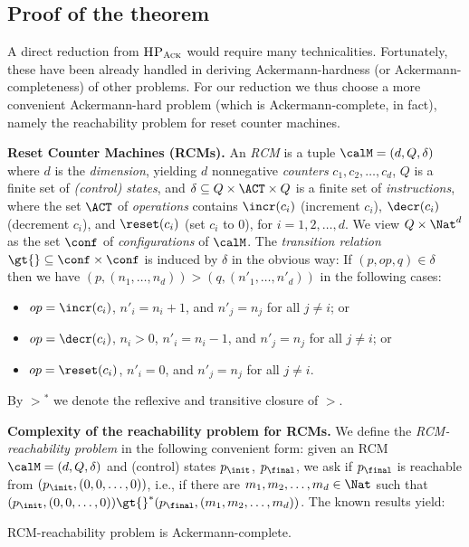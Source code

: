 \documentclass[a4paper,11pt]{article}
\begin{document}
\subsection*{Proof of the theorem}

A direct reduction from $\textsc{HP}_\textsc{Ack}$ would require many
technicalities. Fortunately, these have been already handled in 
deriving  Ackermann-hardness (or Ackermann-completeness) of other
problems.
For our reduction we thus choose a more convenient
Ackermann-hard problem (which is Ackermann-complete, in
fact), namely the reachability problem for reset counter machines.

\textbf{Reset Counter Machines (RCMs).}
An \emph{RCM} is a tuple  $\calM=(d,Q,\delta)$ where 
$d$ is the \emph{dimension}, yielding $d$ nonnegative
\emph{counters} $c_1,c_2,\dots,c_d$,
$Q$ is a
finite set of \emph{(control) states},
and $\delta\subseteq Q\times\ACT\times Q$ is a finite set of
\emph{instructions}, where the set 
$\ACT$ of \emph{operations} contains $\incr(c_i)$ (increment $c_i$),
$\decr(c_i)$ (decrement $c_i$), 
and $\reset(c_i)$ (set $c_i$ to $0$),
for $i=1,2,\dots,d$.
We view $Q\times\Nat^d$ 
as the set $\conf$ of 
\emph{configurations} of $\calM$. 
The \emph{transition relation} $\gt{}\subseteq \conf\times\conf$ is
induced by $\delta$ in the obvious way:
If $(p,op,q)\in\delta$ then we have $(p,
(n_1,\dots,n_d))\gt{}(q,(n'_1,\dots,n'_d))$
in the following cases: 
\begin{itemize}
	\item
		$op=\incr(c_i)$, $n'_i=n_i{+}1$, and $n'_j=n_j$ for
		all $j\neq i$; or 
	\item
$op=\decr(c_i)$, $n_i>0$, $n'_i=n_i{-}1$, and $n'_j=n_j$ for
		all $j\neq i$; or 
	\item
$op=\reset(c_i)$, $n'_i=0$, and $n'_j=n_j$ for
		all $j\neq i$.
\end{itemize}		
By $\gt{}^*$ we denote the reflexive and transitive closure of
$\gt{}$.

\textbf{Complexity of the reachability problem for RCMs.}
We define the \emph{RCM-reachability problem} in the following
convenient form: given an RCM $\calM=(d,Q,\delta)$ and (control) states
$p_\init$, $p_\final$, we ask if $p_\final$ is reachable from
$(p_\init,(0,0,\dots,0))$, i.e., if there are $m_1,m_2,\dots,m_d\in\Nat$
such that
$(p_{\init},(0,0,\dots,0))\gt{}^*(p_\final,(m_1,m_2,\dots,m_d))$.
The known results yield:

\begin{theorem}\label{th:RCMAck}
RCM-reachability problem is Ackermann-complete.
\end{theorem}
\end{document}

